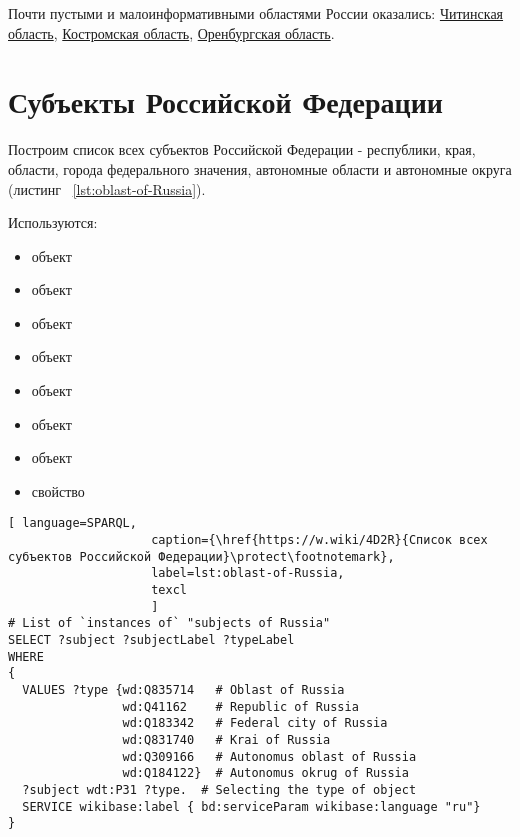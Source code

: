 Почти пустыми и малоинформативными областями России оказались: \href{https://www.wikidata.org/wiki/Q182902}{Читинская область}, \href{https://www.wikidata.org/wiki/Q2596}{Костромская область}, \href{https://www.wikidata.org/wiki/Q5338}{Оренбургская область}.

\section{Субъекты Российской Федерации}

Построим список всех субъектов Российской Федерации - республики, края, области, города федерального значения, автономные области и автономные округа (листинг ~\protect\ref{lst:oblast-of-Russia}).

Используются:
\begin{itemize}
  \item объект 
  \item объект 
  \item объект 
  \item объект 
  \item объект 
  \item объект 
  \item объект 
  \item свойство 
\end{itemize}

\begin{lstlisting}[ language=SPARQL, 
                    caption={\href{https://w.wiki/4D2R}{Список всех субъектов Российской Федерации}\protect\footnotemark},
                    label=lst:oblast-of-Russia,
                    texcl 
                    ]
# List of `instances of` "subjects of Russia" 
SELECT ?subject ?subjectLabel ?typeLabel
WHERE
{  
  VALUES ?type {wd:Q835714   # Oblast of Russia
                wd:Q41162    # Republic of Russia
                wd:Q183342   # Federal city of Russia
                wd:Q831740   # Krai of Russia
                wd:Q309166   # Autonomus oblast of Russia
                wd:Q184122}  # Autonomus okrug of Russia
  ?subject wdt:P31 ?type.  # Selecting the type of object
  SERVICE wikibase:label { bd:serviceParam wikibase:language "ru"}
}
\end{lstlisting}%

